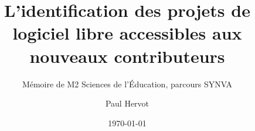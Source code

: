 \titlehead{}
\title{L'identification des projets de logiciel libre accessibles aux nouveaux contributeurs}
\subtitle{Mémoire de M2 Sciences de l'Éducation, parcours SYNVA}
\author[PH]{Paul Hervot}
\date{\today}
\publishers{Université de Strasbourg} %

\frontmatter



\mainmatter
{}
















\appendix




\backmatter



